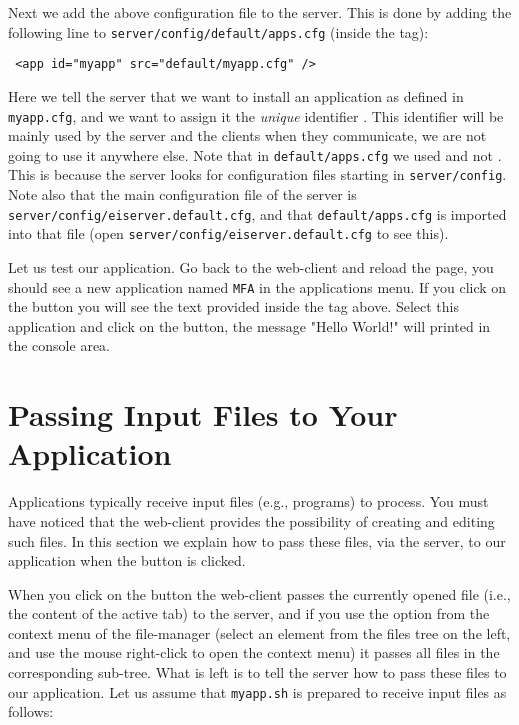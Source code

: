 Next we add the above configuration file to the server. This is done
by adding the following line to \texttt{server/config/default/apps.cfg}
(inside the  tag):

\medskip
\begin{lstlisting}
 <app id="myapp" src="default/myapp.cfg" />
\end{lstlisting}

\medskip
\noindent
Here we tell the server that we want to install an application as
defined in \texttt{myapp.cfg}, and we want to assign it the
\emph{unique} identifier . This identifier will be mainly
used by the server and the clients when they communicate, we are not
going to use it anywhere else. 
%
Note that in \texttt{default/apps.cfg} we used
 and not . This is because
the server looks for configuration files starting in
\texttt{server/config}.
%
Note also that the main configuration file of the \ei server is
\texttt{server/config/eiserver.default.cfg}, and that
\texttt{default/apps.cfg} is imported into that file (open
\texttt{server/config/eiserver.default.cfg} to see this).

Let us test our application. Go back to the web-client and reload the
page, you should see a new application named \texttt{MFA} in the
applications menu. If you click on the \helpbutton button you will see
the text provided inside the  tag above.
%
Select this application and click on the \applybutton button, the
message "Hello World!" will printed in the console area.


\section{Passing Input Files to Your Application}

Applications typically receive input files (e.g., programs) to
process. You must have noticed that the web-client provides the
possibility of creating and editing such files.  In this section we
explain how to pass these files, via the server, to our application
when the \applybutton button is clicked.

When you click on the \applybutton button the web-client passes the
currently opened file (i.e., the content of the active tab) to the
server, and if you use the \applybutton option from the context menu
of the file-manager (select an element from the files tree on the left,
and use the mouse right-click to open the context menu) it passes all
files in the corresponding sub-tree.
%
What is left is to tell the server how to pass these files to our
application. Let us assume that \texttt{myapp.sh} is prepared to
receive input files as follows:

